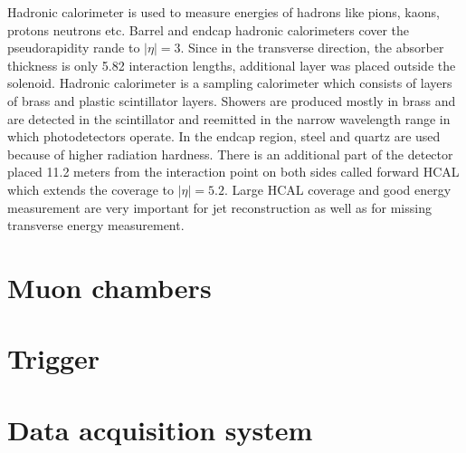 Hadronic calorimeter is used to measure energies of hadrons like pions, kaons, protons neutrons etc. Barrel and endcap hadronic calorimeters cover the pseudorapidity rande to $|\eta|=3$. 
Since in the transverse direction, the absorber thickness is only 5.82 interaction lengths, additional layer was placed outside the solenoid.  Hadronic calorimeter is a sampling calorimeter which consists of layers of brass and plastic scintillator layers. Showers are produced mostly in brass and are detected in the scintillator and reemitted in the narrow wavelength range in which photodetectors operate. In the endcap region, steel and quartz are used because of higher radiation hardness. There is an additional part of the detector placed 11.2 meters from the interaction point on both sides called forward HCAL which extends the coverage to $|\eta|=5.2$. Large HCAL coverage and good energy measurement are very important for jet reconstruction as well as for missing transverse energy measurement.  




\section{Muon chambers}


\section{Trigger}


\section{Data acquisition system}
